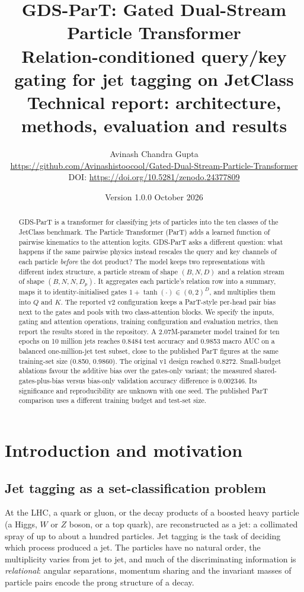 \documentclass[11pt,a4paper]{article}
\title{\textbf{GDS-ParT: Gated Dual-Stream Particle Transformer}\\[6pt]
\large Relation-conditioned query/key gating for jet tagging on JetClass\\[3pt]
\normalsize Technical report: architecture, methods, evaluation and results}
\author{Avinash Chandra Gupta\\\small
\url{https://github.com/Avinashistoocool/Gated-Dual-Stream-Particle-Transformer}\\
\small DOI: \url{https://doi.org/10.5281/zenodo.24377809}}
\date{Version 1.0.0 \quad 30 October 2026}
\numberwithin{equation}{section}
\begin{document}
\maketitle

\begin{abstract}
GDS-ParT is a transformer for classifying jets of particles into the ten classes of the
JetClass benchmark. The Particle Transformer (ParT) adds a learned function of pairwise
kinematics to the attention logits. GDS-ParT asks a different question: what happens if the
same pairwise physics instead rescales the query and key channels of each particle
\emph{before} the dot product? The model keeps two representations with different index
structure, a particle stream of shape $(B,N,D)$ and a relation stream of shape $(B,N,N,D_p)$.
It aggregates each particle's relation row into a summary, maps it to identity-initialised
gates $1+\tanh(\cdot)\in(0,2)^D$, and multiplies them into $Q$ and $K$. The reported v2
configuration keeps a ParT-style per-head pair bias next to the gates and pools with two
class-attention blocks. We specify the inputs, gating and attention operations, training
configuration and evaluation metrics, then report the
results stored in the repository. A 2.07M-parameter model trained for ten epochs on 10 million
jets reaches 0.8484 test accuracy and 0.9853 macro AUC on a balanced one-million-jet test subset,
close to the published ParT figures at the same training-set size (0.850, 0.9860). The original
v1 design reached 0.8272. Small-budget ablations favour the additive bias over the gates-only variant; the measured
shared-gates-plus-bias versus bias-only validation accuracy difference is 0.002346.
Its significance and reproducibility are unknown with one seed. The published ParT comparison
uses a different training budget and test-set size.
\end{abstract}

\tableofcontents
\newpage

\section{Introduction and motivation}\label{sec:intro}
\subsection{Jet tagging as a set-classification problem}
At the LHC, a quark or gluon, or the decay products of a boosted heavy particle (a Higgs, $W$
or $Z$ boson, or a top quark), are reconstructed as a jet: a collimated spray of up to about a
hundred particles. Jet tagging is the task of deciding which process produced a jet. The
particles have no natural order, the multiplicity varies from jet to jet, and much of the
discriminating information is \emph{relational}: angular separations, momentum sharing and the
invariant masses of particle pairs encode the prong structure of a decay.
\end{document}
